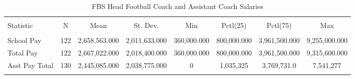 \documentclass[12pt,english]{article}
\begin{document}
\begin{table}[!htbp] \centering 
\label{Table:Table2}
  \caption{FBS Head Football Coach and Assistant Coach Salaries} 
  \label{} 
\begin{tabular}{@{\extracolsep{5pt}}lccccccc} 
\\[-1.8ex]\hline 
\hline \\[-1.8ex] 
Statistic & \multicolumn{1}{c}{N} & \multicolumn{1}{c}{Mean} & \multicolumn{1}{c}{St. Dev.} & \multicolumn{1}{c}{Min} & \multicolumn{1}{c}{Pctl(25)} & \multicolumn{1}{c}{Pctl(75)} & \multicolumn{1}{c}{Max} \\ 
\hline \\[-1.8ex] 
School Pay & 122 & 2,658,563.000 & 2,011,633.000 & 360,000.000 & 800,000.000 & 3,961,500.000 & 9,255,000.000 \\ 
Total Pay & 122 & 2,667,022.000 & 2,018,400.000 & 360,000.000 & 800,000.000 & 3,961,500.000 & 9,315,600.000 \\ 
Asst Pay Total & 130 & 2,445,085.000 & 2,038,775.000 & 0 & 1,035,325 & 3,769,731.0 & 7,541,277 \\ 
\hline \\[-1.8ex] 
\end{tabular} 
\end{table}
\end{document}
